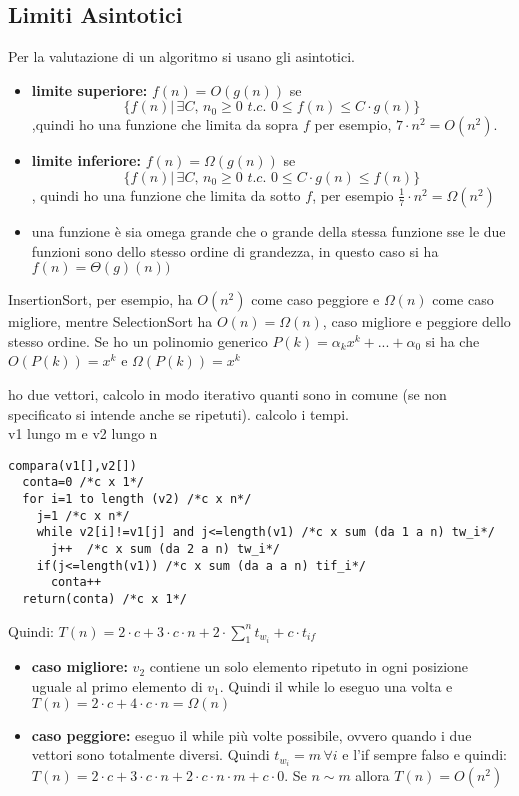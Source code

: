 \documentclass[a4paper,12pt,oneside,tikz]{book}
\begin{document}
\subsection{Limiti Asintotici}
Per la valutazione di un algoritmo si usano gli asintotici.

\begin{itemize}
	\item \textbf{limite superiore:} $f(n)=O(g(n))$ se $$\{f(n)|\,\exists C,\, n_0\geq 0\, \, t.c.\,\, 0\leq f(n)\leq C\cdot g(n)\}$$,quindi ho una funzione che limita da sopra $f$ per esempio, $7\cdot n^2=O(n^2)$.\\

	\item \textbf{limite inferiore:} $f(n)=\Omega(g(n))$ se $$\{f(n)|\,\exists C,\, n_0\geq 0\, \, t.c.\,\, 0  \leq C\cdot g(n)\leq f(n)\}$$, quindi ho una funzione che limita da sotto $f$, per esempio $\frac{1}{7}\cdot n^2=\Omega(n^2)$
	\item  una funzione è sia omega grande che o grande della stessa funzione sse le due funzioni sono dello stesso ordine di grandezza, in questo caso si ha $f(n)=\Theta(g)(n))$
\end{itemize}
InsertionSort, per esempio, ha $O(n^2)$ come caso peggiore e $\Omega(n)$ come caso migliore, mentre SelectionSort ha $O(n)=\Omega(n)$, caso migliore e peggiore dello stesso ordine.
Se ho un polinomio generico $P(k)=\alpha_k x^k+...+\alpha_0$ si ha che $O(P(k))=x^k$ e $\Omega (P(k))=x^k$
\newpage
\begin{esercizio}
	ho due vettori, calcolo in modo iterativo quanti sono in comune (se non specificato si intende anche se ripetuti). calcolo i tempi.\\
	v1 lungo m e v2 lungo n
	\begin{verbatim}
compara(v1[],v2[])
  conta=0 /*c x 1*/
  for i=1 to length (v2) /*c x n*/
    j=1 /*c x n*/
    while v2[i]!=v1[j] and j<=length(v1) /*c x sum (da 1 a n) tw_i*/
      j++  /*c x sum (da 2 a n) tw_i*/
    if(j<=length(v1)) /*c x sum (da a a n) tif_i*/
      conta++
  return(conta) /*c x 1*/
\end{verbatim}
	Quindi: $T(n)=2\cdot c+ 3\cdot c\cdot n+ 2\cdot\sum_1^nt_{w_i}+c\cdot t_{if}$
	\begin{itemize}
		\item \textbf{caso migliore:} $v_2$ contiene un solo elemento ripetuto in ogni posizione uguale al primo elemento di $v_1$. Quindi il while lo eseguo una volta e $T(n)=2\cdot c+4\cdot c\cdot n=\Omega(n)$
		\item \textbf{caso peggiore:} eseguo il while più volte possibile, ovvero quando i due vettori sono totalmente diversi. Quindi $t_{w_i}=m\, \forall i$ e l'if sempre falso e quindi: $T(n)=2\cdot c+ 3\cdot c\cdot n+ 2\cdot c\cdot n\cdot m +c\cdot 0$. Se $n\sim m$ allora $T(n)=O(n^2)$
	\end{itemize}
\end{esercizio}
\end{document}
